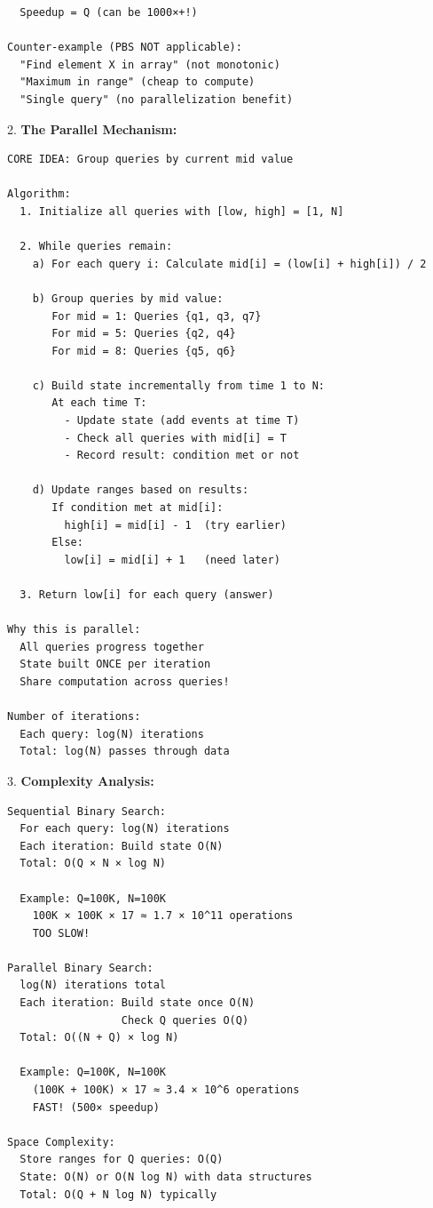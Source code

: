 \documentclass[11pt,a4paper,oneside]{book}
\begin{document}
\begin{tcolorbox}[
    enhanced,breakable,
    colback=white,
    colframe=deepblue,
    boxrule=1.5pt,
    arc=3mm,
    title=\textbf{The Offline Processing Paradigm}
]
\begin{verbatim}
  Speedup = Q (can be 1000×+!)

Counter-example (PBS NOT applicable):
  "Find element X in array" (not monotonic)
  "Maximum in range" (cheap to compute)
  "Single query" (no parallelization benefit)
\end{verbatim}

2. \textbf{The Parallel Mechanism:}
\begin{verbatim}
CORE IDEA: Group queries by current mid value

Algorithm:
  1. Initialize all queries with [low, high] = [1, N]
  
  2. While queries remain:
    a) For each query i: Calculate mid[i] = (low[i] + high[i]) / 2
    
    b) Group queries by mid value:
       For mid = 1: Queries {q1, q3, q7}
       For mid = 5: Queries {q2, q4}
       For mid = 8: Queries {q5, q6}
    
    c) Build state incrementally from time 1 to N:
       At each time T:
         - Update state (add events at time T)
         - Check all queries with mid[i] = T
         - Record result: condition met or not
    
    d) Update ranges based on results:
       If condition met at mid[i]:
         high[i] = mid[i] - 1  (try earlier)
       Else:
         low[i] = mid[i] + 1   (need later)
  
  3. Return low[i] for each query (answer)

Why this is parallel:
  All queries progress together
  State built ONCE per iteration
  Share computation across queries!

Number of iterations:
  Each query: log(N) iterations
  Total: log(N) passes through data
\end{verbatim}

3. \textbf{Complexity Analysis:}
\begin{verbatim}
Sequential Binary Search:
  For each query: log(N) iterations
  Each iteration: Build state O(N)
  Total: O(Q × N × log N)
  
  Example: Q=100K, N=100K
    100K × 100K × 17 ≈ 1.7 × 10^11 operations
    TOO SLOW!

Parallel Binary Search:
  log(N) iterations total
  Each iteration: Build state once O(N)
                  Check Q queries O(Q)
  Total: O((N + Q) × log N)
  
  Example: Q=100K, N=100K
    (100K + 100K) × 17 ≈ 3.4 × 10^6 operations
    FAST! (500× speedup)

Space Complexity:
  Store ranges for Q queries: O(Q)
  State: O(N) or O(N log N) with data structures
  Total: O(Q + N log N) typically


\end{verbatim}
\end{tcolorbox}
\end{document}
